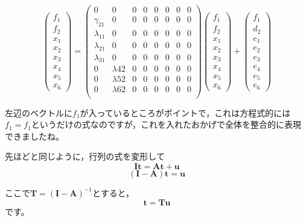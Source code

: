 \documentclass{ltjsbook}
\begin{document}
\[
	\begin{pmatrix} f_1\\f_2\\x_1\\x_2\\x_3\\x_4\\x_5\\x_6 \end{pmatrix} =
	\begin{pmatrix}
		0            & 0           & 0 & 0 & 0 & 0 & 0 & 0 \\
		\gamma_{21}  & 0           & 0 & 0 & 0 & 0 & 0 & 0 \\
		\lambda_{11} & 0           & 0 & 0 & 0 & 0 & 0 & 0 \\
		\lambda_{21} & 0           & 0 & 0 & 0 & 0 & 0 & 0 \\
		\lambda_{31} & 0           & 0 & 0 & 0 & 0 & 0 & 0 \\
		0            & \lambda{42} & 0 & 0 & 0 & 0 & 0 & 0 \\
		0            & \lambda{52} & 0 & 0 & 0 & 0 & 0 & 0 \\
		0            & \lambda{62} & 0 & 0 & 0 & 0 & 0 & 0 \\
	\end{pmatrix}
	\begin{pmatrix} f_1\\f_2\\x_1\\x_2\\x_3\\x_4\\x_5\\x_6 \end{pmatrix}+
	\begin{pmatrix} f_1\\d_2\\e_1\\e_2\\e_3\\e_4\\e_5\\e_6 \end{pmatrix}
\]


左辺のベクトルに$f_1$が入っているところがポイントで，これは方程式的には$f_1=f_1$というだけの式なのですが，これを入れたおかげで全体を整合的に表現できましたね。

先ほどと同じように，行列の式を変形して
\[\bm{It} = \bm{At}+ \bm{u} \]
\[ (\bm{I}-\bm{A})\bm{t} = \bm{u}\]

ここで$\bm{T} = (\bm{I}-\bm{A})^{-1}$とすると，
\[ \bm{t} = \bm{T}\bm{u} \]
です。
\end{document}
